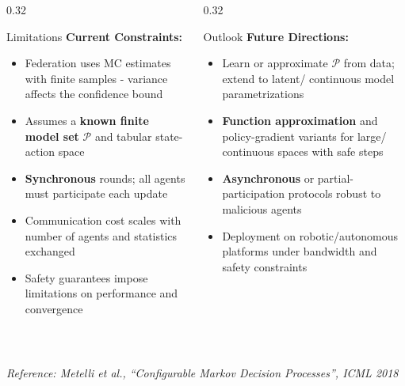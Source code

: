 \documentclass[final,t]{beamer}
\begin{document}
\begin{frame}[t]
\begin{columns}[T]
\begin{column}{0.32\textwidth}
\begin{block}{Limitations}
\textbf{Current Constraints:}
\begin{itemize}
    \item Federation uses MC estimates with finite samples - variance affects the confidence bound
    \item Assumes a \textbf{known finite model set} $\mathcal{P}$ and tabular state-action space
    \item \textbf{Synchronous} rounds; all agents must participate each update
    \item Communication cost scales with number of agents and statistics exchanged
    \item Safety guarantees impose limitations on performance and convergence
\end{itemize}
\end{block}
\end{column}

\begin{column}{0.32\textwidth}
\begin{block}{Outlook}
\textbf{Future Directions:}
\begin{itemize}
    \item Learn or approximate $\mathcal{P}$ from data; extend to latent/ continuous model parametrizations
    \item \textbf{Function approximation} and policy-gradient variants for large/ continuous spaces with safe steps
    \item \textbf{Asynchronous} or partial-participation protocols robust to malicious agents
    \item Deployment on robotic/autonomous platforms under bandwidth and safety constraints
\end{itemize}
\end{block}
\end{column}

\end{columns}

\\[0.5cm]
\begin{center}
\setlength{\fboxsep}{12pt}
\end{center}

\vspace{0.5cm}
\begin{center}
\small\textit{Reference: Metelli et al., ``Configurable Markov Decision Processes'', ICML 2018}
\end{center}

\end{frame}
\end{document}
